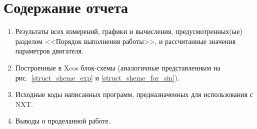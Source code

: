 \documentclass[12pt, a4paper, openany]{extarticle}
\begin{document}
\newpage
\section{Содержание отчета}
\begin{enumerate}
\item Результаты всех измерений, графики и вычисления, предусмотренных(ые) разделом <<Порядок выполнения работы>>, и рассчитанные значения параметров двигателя.
\item Построенные в Xcos блок-схемы (аналогичные представленным на рис.~\ref{struct_sheme_exp} и \ref{struct_sheme_for_sin}).
\item Исходные коды написанных программ, предназначенных для использования с NXT.
\item Выводы о проделанной работе.
\end{enumerate}
\end{document}
